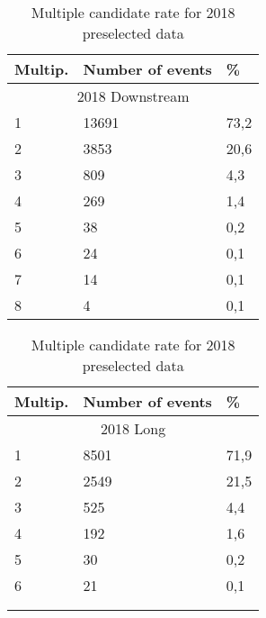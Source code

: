 \begin{table}[h!]
\begin{center}
\begin{tabular}{ p{2.6cm}p{3.1cm}p{0.6cm} }
\hline
\hline
Multip.  & Number of events & \% \\
\hline
    \multicolumn{3}{c}{2018 Downstream}\\
\hline

     1    & 13691	& 73,2 \\
     2    & 3853	& 20,6 \\
     3    & 809	& 4,3 \\
     4    & 269	& 1,4 \\
     5    & 38	& 0,2 \\
     6    & 24	& 0,1 \\
     7    & 14	& 0,1 \\
     8    & 4	& 0,1 \\

\hline
\end{tabular}
\quad
\begin{tabular}{ p{2.6cm}p{3.1cm}p{0.6cm} }
\hline
\hline
Multip.  & Number of events & \% \\
\hline
    \multicolumn{3}{c}{2018 Long}\\
\hline

     1    & 8501	& 71,9 \\
     2    & 2549	& 21,5 \\
     3    & 525	& 4,4 \\
     4    & 192	& 1,6 \\
     5    & 30	& 0,2 \\
     6    & 21	& 0,1 \\
         & 	&  \\
         & 	&  \\
    

\hline
\end{tabular}
\caption{Multiple candidate rate for 2018 preselected data}
\label{tab:multi2018sel}
\end{center}
\end{table}%

